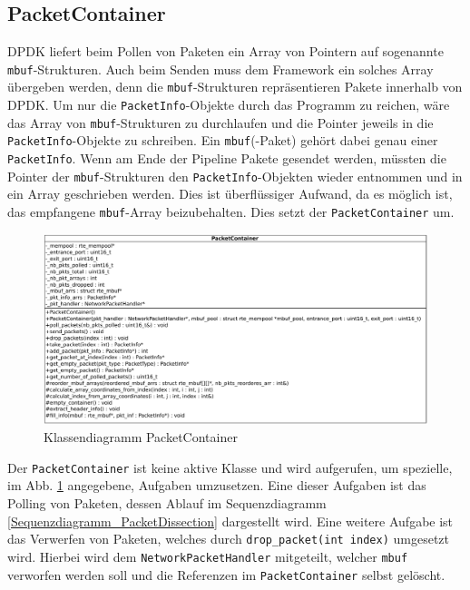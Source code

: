 \documentclass[../review_3.tex]{subfiles}
\begin{document}
\subsection{PacketContainer}
DPDK liefert beim Pollen von Paketen ein Array von Pointern auf sogenannte \texttt{mbuf}-Strukturen. Auch beim Senden muss dem Framework ein solches Array übergeben werden, denn die \texttt{mbuf}-Strukturen repräsentieren Pakete innerhalb von DPDK. Um nur die \texttt{PacketInfo}-Objekte durch das Programm zu reichen, wäre das Array von \texttt{mbuf}-Strukturen zu durchlaufen und die Pointer jeweils in die \texttt{PacketInfo}-Objekte zu schreiben. Ein \texttt{mbuf}(-Paket) gehört dabei genau einer \texttt{PacketInfo}. Wenn am Ende der Pipeline Pakete gesendet werden, müssten die Pointer der \texttt{mbuf}-Strukturen den \texttt{PacketInfo}-Objekten wieder entnommen und in ein Array geschrieben werden. Dies ist überflüssiger Aufwand, da es möglich ist, das empfangene \texttt{mbuf}-Array beizubehalten. Dies setzt der \texttt{PacketContainer} um.

\begin{figure}
    \centering
    \includegraphics[width=\linewidth]{img/PacketContainerClass.pdf}
    \caption{Klassendiagramm PacketContainer}
    \label{Klassendiagramm_PacketContainer}
\end{figure}

Der \texttt{PacketContainer} ist keine aktive Klasse und wird aufgerufen, um spezielle, im Abb. \ref{Klassendiagramm_PacketContainer} angegebene, Aufgaben umzusetzen. Eine dieser Aufgaben ist das Polling von Paketen, dessen Ablauf im Sequenzdiagramm \ref{Sequenzdiagramm_PacketDissection} dargestellt wird. Eine weitere Aufgabe ist das Verwerfen von Paketen, welches durch \texttt{drop\_packet(int index)} umgesetzt wird. Hierbei wird dem \texttt{NetworkPacketHandler} mitgeteilt, welcher \texttt{mbuf} verworfen werden soll und die Referenzen im \texttt{PacketContainer} selbst gelöscht.
\end{document}
